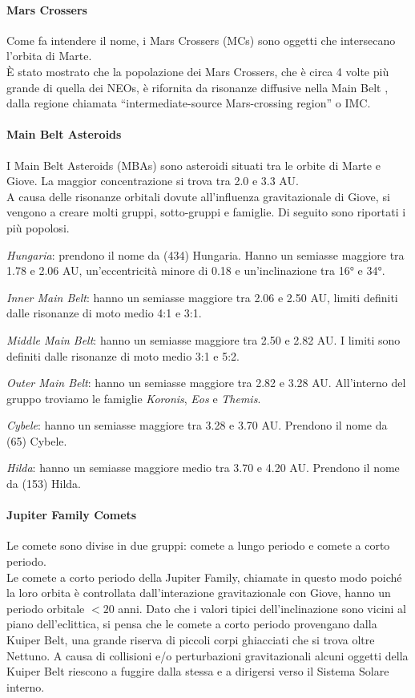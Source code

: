 \paragraph*{Mars Crossers}
Come fa intendere il nome, i Mars Crossers (MCs) sono oggetti che intersecano l’orbita di Marte.\\
È stato mostrato che la popolazione dei Mars Crossers, che è circa 4 volte più grande di quella dei NEOs, è rifornita da risonanze diffusive nella Main Belt \citep{migliorini_origin_1998, morbidelli_numerous_1999, michel_population_2000, bottke_debiased_2002}, dalla regione chiamata “intermediate-source Mars-crossing region” o IMC.

\paragraph*{Main Belt Asteroids}
I Main Belt Asteroids (MBAs) sono asteroidi situati tra le orbite di Marte e Giove. La maggior concentrazione si trova tra 2.0 e 3.3 AU.\\
A causa delle risonanze orbitali dovute all’influenza gravitazionale di Giove, si vengono a creare molti gruppi, sotto-gruppi e famiglie. Di seguito sono riportati i più popolosi.

\qquad \textit{Hungaria}: prendono il nome da (434) Hungaria. Hanno un semiasse maggiore tra 1.78 e 2.06 AU, un’eccentricità minore di 0.18 e un’inclinazione tra 16° e 34°. 

\qquad \textit{Inner Main Belt}: hanno un semiasse maggiore tra 2.06 e 2.50 AU, limiti definiti dalle risonanze di moto medio 4:1 e 3:1.

\qquad \textit{Middle Main Belt}: hanno un semiasse maggiore tra 2.50 e 2.82 AU. I limiti sono definiti dalle risonanze di moto medio 3:1 e 5:2.

\qquad \textit{Outer Main Belt}: hanno un semiasse maggiore tra 2.82 e 3.28 AU. All’interno del gruppo troviamo le famiglie \textit{Koronis}, \textit{Eos} e \textit{Themis}.

\qquad \textit{Cybele}: hanno un semiasse maggiore tra 3.28 e 3.70 AU. Prendono il nome da (65) Cybele.

\qquad \textit{Hilda}: hanno un semiasse maggiore medio tra 3.70 e 4.20 AU. Prendono il nome da (153) Hilda.

\paragraph*{Jupiter Family Comets}
Le comete sono divise in due gruppi: comete a lungo periodo e comete a corto periodo.\\
Le comete a corto periodo della Jupiter Family, chiamate in questo modo poiché la loro orbita è controllata dall'interazione gravitazionale con Giove, hanno un periodo orbitale $< 20$ anni. 
Dato che i valori tipici dell'inclinazione sono vicini al piano dell'eclittica, si pensa che le comete a corto periodo provengano dalla Kuiper Belt, una grande riserva di piccoli corpi ghiacciati che si trova oltre Nettuno. A causa di collisioni e/o perturbazioni gravitazionali alcuni oggetti della Kuiper Belt riescono a fuggire dalla stessa e a dirigersi verso il Sistema Solare interno.

